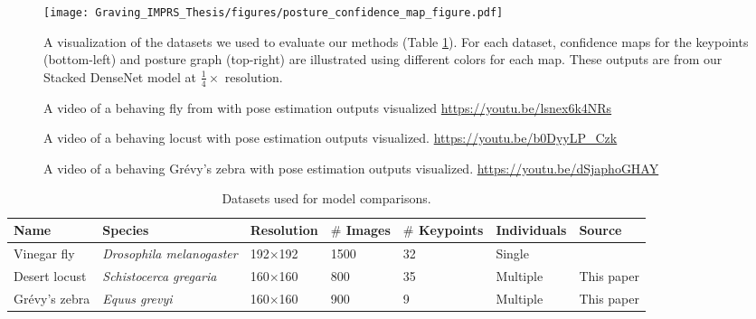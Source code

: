 \documentclass[11pt,a4paper,oneside]{book}
\begin{document}
\begin{figure}[!htb]

\begin{center}
\texttt{[image: Graving\_IMPRS\_Thesis/figures/posture\_confidence\_map\_figure.pdf]}
\end{center}
\caption{A visualization of the datasets we used to evaluate our methods (Table \ref{tab:datasets}). For each dataset, confidence maps for the keypoints (bottom-left) and posture graph (top-right) are illustrated using different colors for each map. These outputs are from our Stacked DenseNet model at $\frac{1}{4}\times$ resolution.}
\label{fig:posture_confidence_map_figure}


\end{figure}
\begin{figure}[!htb]
    \centering
    \caption{A video of a behaving fly from \cite{pereira2019fast} with pose estimation outputs visualized \url{https://youtu.be/lsnex6k4NRs}}
    \label{videosupp:sv1}
\end{figure}

\begin{figure}[!htb]
    \centering
    \caption{A video of a behaving locust with pose estimation outputs visualized. \url{https://youtu.be/b0DyyLP_Czk}}
    \label{videosupp:sv2}
\end{figure}

\begin{figure}[!htb]
    \centering
    \caption{A video of a behaving Grévy's zebra with pose estimation outputs visualized. \url{https://youtu.be/dSjaphoGHAY}}
    \label{videosupp:sv3}
\end{figure}


\begin{table}[!htb]

\caption{\label{tab:datasets}Datasets used for model comparisons.}
\setlength{\tabcolsep}{2pt}
\centering
\begin{tabular}{|m{}|m{}|m{}|m{}|m{}|m{}|m{}|}
\hline
{Name} & Species   & {Resolution}  & {$\#$ Images}  & {$\#$ Keypoints} & {Individuals} & Source    \\ \hline
Vinegar fly  & \textit{Drosophila melanogaster} & {192$\times$192} & 1500 & 32 & Single & \cite{pereira2019fast} \\ \hline
Desert locust     & \textit{Schistocerca gregaria}       & 160$\times$160           & 800    & 35 & Multiple  & This paper\\ \hline
Grévy's zebra      & \textit{Equus grevyi}      & 160$\times$160              & 900    & 9 & Multiple & This paper \\ \hline
\end{tabular}

\end{table}
\end{document}

